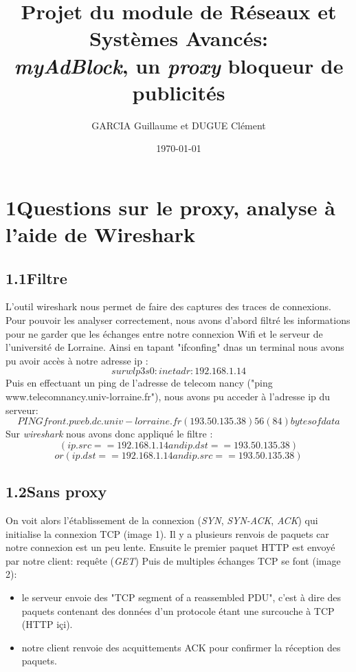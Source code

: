 \documentclass[12pt, a4paper]{report}
\title{Projet du module de Réseaux et Systèmes  Avancés:\\ \textit{myAdBlock}, un \textit{proxy} bloqueur de publicités}
\author{GARCIA  Guillaume et DUGUE Clément}
\date{\today}
\begin{document}
\maketitle


\hypersetup{linkcolor=blue}

\chapter*{1\hspace{1cm}Questions sur le proxy, analyse à l'aide de Wireshark}

\section*{\hspace{0.6cm}1.1\hspace{0.6cm}Filtre}
\hspace{1cm}L'outil wireshark nous permet de faire des captures des traces de connexions. Pour pouvoir les analyser correctement, nous avons d'abord filtré les informations pour ne garder que les échanges entre notre connexion Wifi et le serveur de l'université de Lorraine. Ainsi en tapant "ifconfing" dnas un terminal nous avons pu avoir accès à notre adresse ip : \[sur wlp3s0 : inet adr:192.168.1.14\]
\hspace{1cm}Puis en effectuant un ping de l'adresse de telecom nancy ("ping www.telecomnancy.univ-lorraine.fr"), nous avons pu acceder à l'adresse ip du serveur: \[PING front.pweb.dc.univ-lorraine.fr (193.50.135.38) 56(84) bytes of data\]
\hspace{1cm}Sur \textit{wireshark} nous avons donc appliqué le filtre :
\[(ip.src == 192.168.1.14 and ip.dst==193.50.135.38)\] \[ or (ip.dst==192.168.1.14 and ip.src==193.50.135.38)\]


\section*{\hspace{0.6cm}1.2\hspace{0.6cm}Sans proxy}
\hspace{1cm}On voit alors l'établissement de la connexion (\textit{SYN}, \textit{SYN-ACK}, \textit{ACK}) qui initialise la connexion TCP (image 1). Il y a plusieurs renvois de paquets car notre connexion est un peu lente. Ensuite le premier paquet HTTP est envoyé par notre client: requête (\textit{GET})
Puis de multiples échanges TCP se font (image 2):
\begin{itemize}
\item \hspace{0.2cm}le serveur envoie des "TCP segment of a reassembled PDU", c'est à dire des paquets contenant des données d'un protocole étant une surcouche à TCP (HTTP içi).
\item \hspace{0.2cm}notre client renvoie des acquittements ACK pour confirmer la réception des paquets.
\end{itemize}
\end{document}
